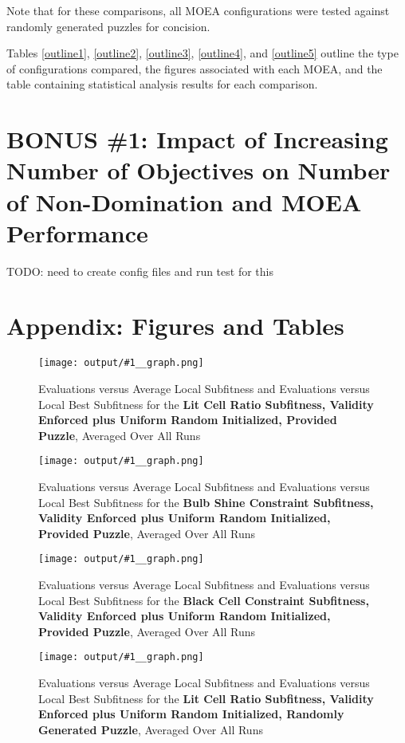 \documentclass[11pt]{article}
\newcommand{\fitnessplotcaption}[1]{\caption{Evaluations versus Average Local Subfitness and Evaluations versus 
    Local Best Subfitness for the \textbf{{#1}}, Averaged Over All Runs}}
\newcommand{\addgraphic}[1]{\centerline{\texttt{[image: output/\#1\_\_graph.png]}}}
\begin{document}
Note that for these comparisons, all MOEA configurations were tested against randomly generated puzzles
for concision.

Tables \ref{outline1}, \ref{outline2}, \ref{outline3}, \ref{outline4}, and \ref{outline5}
outline the type of configurations compared, the figures associated
with each MOEA, and the table containing statistical analysis results for each comparison.

    


\section{BONUS \#1: Impact of Increasing Number of Objectives on Number of Non-Domination and MOEA Performance}

TODO: need to create config files and run test for this


\section{Appendix: Figures and Tables}



\begin{figure}
    \addgraphic{website_puzzle/website_puzzle_lit_cell_ratio}
    \fitnessplotcaption{Lit Cell Ratio Subfitness, Validity Enforced plus Uniform Random Initialized, Provided Puzzle}
    \label{fig:website_v_ratio}
\end{figure}

\begin{figure}
    \addgraphic{website_puzzle/website_puzzle_bulb_shine_constr}
    \fitnessplotcaption{Bulb Shine Constraint Subfitness, Validity Enforced plus Uniform Random Initialized, Provided Puzzle}
    \label{fig:website_v_shine}
\end{figure}

\begin{figure}
    \addgraphic{website_puzzle/website_puzzle_black_cell_constr}
    \fitnessplotcaption{Black Cell Constraint Subfitness, Validity Enforced plus Uniform Random Initialized, Provided Puzzle}
    \label{fig:website_v_black}
\end{figure}

\begin{figure}
    \addgraphic{random_gen/random_gen_lit_cell_ratio}
    \fitnessplotcaption{Lit Cell Ratio Subfitness, Validity Enforced plus Uniform Random Initialized, Randomly Generated Puzzle}
    \label{fig:random_gen_v_ratio}
\end{figure}
\end{document}
